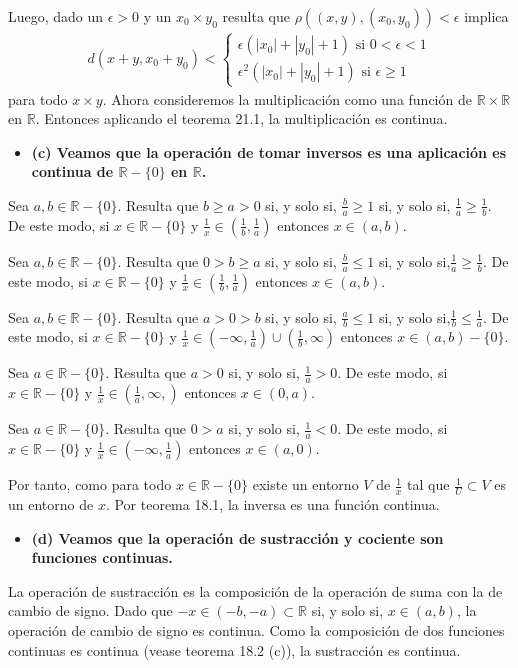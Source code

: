 \documentclass{article}
\begin{document}
Luego, dado un $\epsilon>0$ y un $x_0\times y_0$ resulta que $\rho((x,y),(x_0,y_0))<\epsilon$ implica
\begin{eqnarray}
d(x+y,x_0+ y_0)<\begin{cases}\epsilon\left(|x_0|+|y_0|+1\right)  \text{ si }0<\epsilon<1\nonumber\\
\epsilon^2\left(|x_0|+|y_0|+1\right) \text{ si }\epsilon\geq 1\nonumber
\end{cases}
\end{eqnarray}
para todo $x\times y$.
Ahora consideremos la multiplicación como una función de $\mathbb{R}\times \mathbb{R}$ en $ \mathbb{R}$. Entonces aplicando el teorema 21.1, la multiplicación es continua.
\begin{itemize}
\item \bf (c) \rm Veamos que la operación de tomar inversos es una aplicación es continua de $\mathbb{R}-\{0\}$ en $\mathbb{R}$.
\end{itemize}
Sea $a,b\in\mathbb{R}-\{0\}$. Resulta que $b\geq a>0$ si, y solo si, $\frac{b}{a}\geq 1$ si, y solo si, $\frac{1}{a}\geq \frac{1}{b}$. De este modo, si $x\in \mathbb{R}-\{0\}$ y $\frac{1}{x}\in (\frac{1}{b},\frac{1}{a})$ entonces $x\in (a,b)$.

Sea $a,b\in\mathbb{R}-\{0\}$. Resulta que $0>b\geq a$ si, y solo si, $\frac{b}{a}\leq 1$ si, y solo si,$\frac{1}{a}\geq \frac{1}{b}$. De este modo, si $x\in \mathbb{R}-\{0\}$ y $\frac{1}{x}\in (\frac{1}{b},\frac{1}{a})$ entonces $x\in (a,b)$.

Sea $a,b\in\mathbb{R}-\{0\}$. Resulta que $a>0> b$ si, y solo si, $\frac{a}{b}\leq 1$ si, y solo si,$\frac{1}{b}\leq \frac{1}{a}$. De este modo, si $x\in \mathbb{R}-\{0\}$ y $\frac{1}{x}\in (-\infty,\frac{1}{a})\cup(\frac{1}{b},\infty)$ entonces $x\in (a,b)-\{0\}$. 

Sea $a\in\mathbb{R}-\{0\}$. Resulta que $a>0$ si, y solo si, $\frac{1}{a}> 0$. De este modo, si $x\in \mathbb{R}-\{0\}$ y $\frac{1}{x}\in (\frac{1}{a},\infty,)$ entonces $x\in (0,a)$.

Sea $a\in\mathbb{R}-\{0\}$. Resulta que $0> a$ si, y solo si, $\frac{1}{a}< 0$. De este modo, si $x\in \mathbb{R}-\{0\}$ y $\frac{1}{x}\in (-\infty,\frac{1}{a})$ entonces $x\in (a,0)$.

Por tanto, como para todo $x\in\mathbb{R}-\{0\}$ existe un entorno $V$ de $\frac{1}{x}$ tal que $\frac{1}{U}\subset V$ es un entorno de $x$. Por teorema 18.1, la inversa es una función continua.
\begin{itemize}
\item \bf (d) \rm Veamos que la operación de sustracción y cociente son funciones continuas.
\end{itemize}
La operación de sustracción es la composición de la operación de suma con la de cambio de signo. Dado que $-x\in (-b,-a)\subset \mathbb{R}$ si, y solo si, $x\in (a,b)$, la operación de cambio de signo es continua. Como la composición de dos funciones continuas es continua (vease teorema 18.2 (c)), la sustracción es continua.
\end{document}
